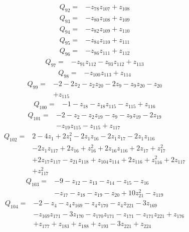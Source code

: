 \[\begin{aligned}Q_{92}={}&-z_{78}z_{107}+z_{108}
\end{aligned}\]
\[\begin{aligned}Q_{93}={}&-z_{80}z_{108}+z_{109}
\end{aligned}\]
\[\begin{aligned}Q_{94}={}&-z_{82}z_{109}+z_{110}
\end{aligned}\]
\[\begin{aligned}Q_{95}={}&-z_{84}z_{110}+z_{111}
\end{aligned}\]
\[\begin{aligned}Q_{96}={}&-z_{86}z_{111}+z_{112}
\end{aligned}\]
\[\begin{aligned}Q_{97}={}&-z_{91}z_{112}-z_{93}z_{112}+z_{113}
\end{aligned}\]
\[\begin{aligned}Q_{98}={}&-z_{100}z_{113}+z_{114}
\end{aligned}\]
\[\begin{aligned}Q_{99}={}&-2-2z_{2}-z_{2}z_{20}-2z_{9}-z_{9}z_{20}-z_{20}
\\&+z_{115}
\end{aligned}\]
\[\begin{aligned}Q_{100}={}&-1-z_{18}-z_{18}z_{115}-z_{115}+z_{116}
\end{aligned}\]
\[\begin{aligned}Q_{101}={}&-2-z_{2}-z_{2}z_{19}-z_{9}-z_{9}z_{19}-2z_{19}
\\&-z_{19}z_{115}-z_{115}+z_{117}
\end{aligned}\]
\[\begin{aligned}Q_{102}={}&2-4z_{1}+2z_{1}^{2}-2z_{1}z_{16}-2z_{1}z_{17}-2z_{1}z_{116}
\\&-2z_{1}z_{117}+2z_{16}+z_{16}^{2}+2z_{16}z_{116}+2z_{17}+z_{17}^{2}
\\&+2z_{17}z_{117}-z_{21}z_{118}+z_{104}z_{114}+2z_{116}+z_{116}^{2}+2z_{117}
\\&+z_{117}^{2}
\end{aligned}\]
\[\begin{aligned}Q_{103}={}&-9-z_{12}-z_{13}-z_{14}-z_{15}-z_{16}
\\&-z_{17}-z_{18}-z_{19}-z_{20}+10z_{21}^{2}-z_{119}
\end{aligned}\]
\[\begin{aligned}Q_{104}={}&-2-z_{4}-z_{4}z_{169}-z_{4}z_{170}-z_{4}z_{221}-3z_{169}
\\&-z_{169}z_{171}-3z_{170}-z_{170}z_{171}-z_{171}-z_{171}z_{221}+z_{176}
\\&+z_{177}+z_{183}+z_{188}+z_{193}-3z_{221}+z_{224}
\end{aligned}\]
